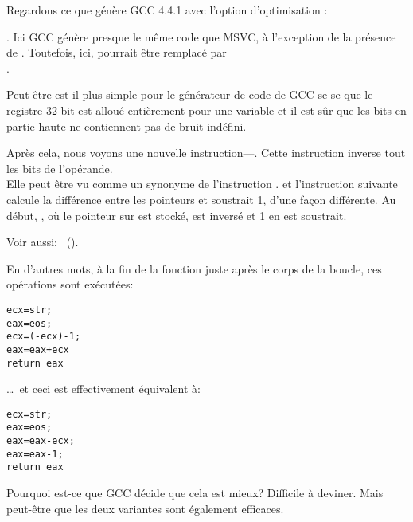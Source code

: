 


Regardons ce que génère GCC 4.4.1 avec l'option d'optimisation \Othree:



.
Ici GCC génère presque le même code que MSVC, à l'exception de la présence de \MOVZX.
Toutefois, ici, \MOVZX pourrait être remplacé par\\
.

Peut-être est-il plus simple pour le générateur de code de GCC se se 
que le registre 32-bit \EDX est alloué entièrement pour une variable \Tchar et il
est sûr que les bits en partie haute ne contiennent pas de bruit indéfini.

\label{strlen_NOT_ADD}

Après cela, nous voyons une nouvelle instruction---\NOT. Cette instruction inverse
tout les bits de l'opérande. \\
Elle peut être vu comme un synonyme de l'instruction .
\NOT et l'instruction suivante \ADD calcule la différence entre les pointeurs et
soustrait 1, d'une façon différente.
Au début, \ECX, où le pointeur sur  est stocké, est inversé et 1 en est soustrait.

Voir aussi: \q{\SignedNumbersSectionName}~().

En d'autres mots, à la fin de la fonction juste après le corps de la boucle, ces opérations
sont exécutées:

\begin{lstlisting}[style=customc]
ecx=str;
eax=eos;
ecx=(-ecx)-1;
eax=eax+ecx
return eax
\end{lstlisting}

\dots~et ceci est effectivement équivalent à:

\begin{lstlisting}[style=customc]
ecx=str;
eax=eos;
eax=eax-ecx;
eax=eax-1;
return eax
\end{lstlisting}

Pourquoi est-ce que GCC décide que cela est mieux? Difficile à deviner.
Mais peut-être que les deux variantes sont également efficaces.
